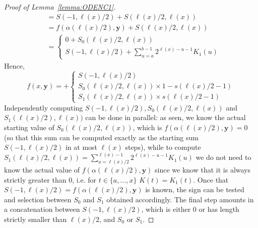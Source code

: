 \documentclass[11pt, oneside]{article}
\newenvironment{toappendix}{}{}
\newcommand{\tu}[1]{\mathbf{#1}}
\theoremstyle{definition}
\begin{document}
\begin{toappendix}
\begin{proof}[Proof of Lemma~\ref{lemma:ODENC1}]
\begin{align*}
        &= S(-1, \ell(x)/2) + S(\ell(x)/2, \ell(x)) \\
        &= f(\alpha(\ell(x)/2), \tu y) + S(\ell(x)/2, \ell(x)) \\
        &= \begin{cases}
            0 + S_0(\ell(x)/2, \ell(x)) \\
            S(-1, \ell(x)/2) + \sum^{b-1}_{u=a} 2^{\ell(x)-u-1} K_1(u)
        \end{cases}
    \end{align*}
    Hence,
    $$
     f(x, \tu y) = + \begin{cases}
        S(-1, \ell(x)/2) \\
        S_0(\ell(x)/2, \ell(x)) \times 1 - s(\ell(x)/2-1) \\
        S_1(\ell(x)/2, \ell(x)) \times s(\ell(x)/2-1)
    \end{cases}
    $$
    Independently computing $S(-1, \ell(x)/2), S_0(\ell(x)/2, \ell(x))$ and $S_1(\ell(x)/2), \ell(x))$ can be done in parallel: as seen, we know the actual starting value of $S_0(\ell(x)/2, \ell(x))$, which is $f(\alpha(\ell(x)/2), \tu y)=0$ (so that this sum can be computed exactly as the starting sum $S(-1, \ell(x)/2)$ in at most $\ell(x)$ steps), while to compute $S_1(\ell(x)/2, \ell(x))=\sum^{\ell(x)-1}_{u=\ell(x)/2} 2^{\ell(x)-u-1}K_1(u)$ we do not need to know the actual value of $f(\alpha(\ell(x)/2), \tu y)$ since we know that it is always strictly greater than 0, i.e. for $t\in \{a, \dots, x\}$ $K(t)=K_1(t)$.
    Once that $S(-1, \ell(x)/2)=f(\alpha(\ell(x)/2), \tu y)$ is known, the sign can be tested and selection between $S_0$ and $S_1$ obtained accordingly.
    The final step amounts in a concatenation between $S(-1, \ell(x)/2)$, which is either 0 or has length strictly smaller than $\ell(x)/2$, and $S_0$ or $S_1$.
\end{proof}









\end{toappendix}
\end{document}
